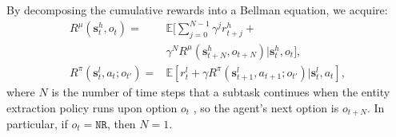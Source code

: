 \documentclass[letterpaper]{article} %
\theoremstyle{definition}
\begin{document}
By decomposing the cumulative rewards into a Bellman equation, we acquire:
\begin{equation}\label{return}
    \begin{split}
        R^\mu(\mathbf{s}_t^h, o_t) =& \mathbb{E} [\sum_{j=0}^{N-1} \gamma^j r_{t+j}^h + \\ &\gamma^{N} R^\mu(\mathbf{s}_{t+N}^h, o_{t+N}) |\mathbf{s}_t^h, o_t], \\
        R^\pi(\mathbf{s}_t^l, a_t; o_{t'}) =& \mathbb{E} [r_t^l + \gamma R^\pi(\mathbf{s}_{t+1}^l, a_{t+1}; o_{t'}) | \mathbf{s}_t^l, a_t],
    \end{split}
\end{equation}
where $N$ is the number of time steps that a subtask continues when the entity extraction policy runs upon option $o_t$
, so the agent's next option is $o_{t+N}$. In particular, if $o_t = \texttt{NR}$, then $N = 1$.
\end{document}
